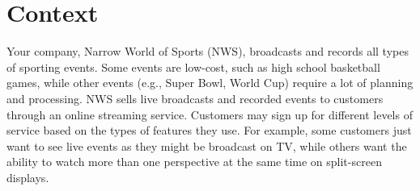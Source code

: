 \section{Context}

Your company, Narrow World of Sports (NWS), broadcasts and records all types of 
sporting events. Some events are low-cost, such as high school basketball games, 
while other events (e.g., Super Bowl, World Cup) require a lot of planning and 
processing. NWS sells live broadcasts and recorded events to customers through 
an online streaming service. Customers may sign up for different levels of 
service based on the types of features they use. For example, some customers 
just want to see live events as they might be broadcast on TV, while others 
want the ability to watch more than one perspective at the same time 
on split-screen displays.